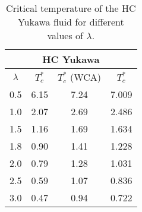 \begin{table}[h]
	\noindent\caption{Critical temperature of the HC Yukawa fluid for different values of $\lambda$.}\vskip3mm
		\begin{tabular}{|c|c|c|c|}
			\hline
			\multicolumn{4}{|c|}{HC Yukawa}\\
			\hline
			$\lambda$ & $T_c^*$ & $T_c^*$ (WCA)& $T_c^*$ \cite{MendoubWaxJakse2010} \\
			\hline
			0.5 & 6.15 & 7.24 & 7.009 \\
			1.0 & 2.07 & 2.69 & 2.486 \\
			1.5 & 1.16 & 1.69 & 1.634 \\
			1.8 & 0.90 & 1.41 & 1.228 \\
			2.0 & 0.79 & 1.28 & 1.031 \\
			2.5 & 0.59 & 1.07 & 0.836 \\
			3.0 & 0.47 & 0.94 & 0.722 \\
			\hline
		\end{tabular}
	\label{tab:yukawa_temp_cr}
\end{table}

